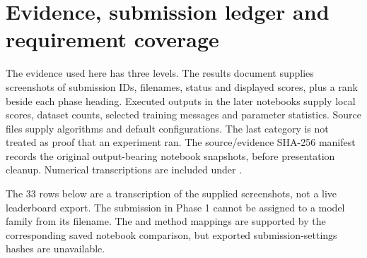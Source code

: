 \section{Evidence, submission ledger and requirement coverage}
\label{app:ledger}
The evidence used here has three levels. The results document supplies screenshots of submission IDs,
filenames, status and displayed scores, plus a rank beside each phase heading. Executed outputs in the
later notebooks supply local scores, dataset counts, selected training messages and parameter
statistics. Source files supply algorithms and default configurations. The last category is not treated
as proof that an experiment ran. The source/evidence SHA-256 manifest records the original output-bearing notebook snapshots, before presentation cleanup. Numerical transcriptions are
included under .

The 33 rows below are a transcription of the supplied screenshots, not a live leaderboard export.
The submission  in Phase 1 cannot be assigned to a model family from its filename.
The  and  method mappings are supported by the corresponding saved notebook
comparison, but exported submission-settings hashes are unavailable.


